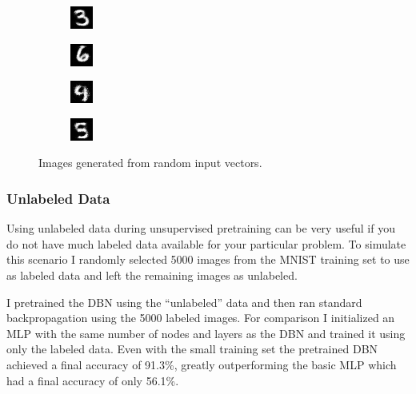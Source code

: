 \documentclass{article}
\begin{document}
	\begin{figure}[h]
		\centering
		\begin{subfigure}[b]{0.2\textwidth}
			\centering
			\includegraphics[scale=2.0]{images/rand_gen1}
		\end{subfigure}
		\begin{subfigure}[b]{0.2\textwidth}
			\centering
			\includegraphics[scale=2.0]{images/rand_gen2}
		\end{subfigure}		
		\begin{subfigure}[b]{0.2\textwidth}
			\centering
			\includegraphics[scale=2.0]{images/rand_gen3}
		\end{subfigure}
		\begin{subfigure}[b]{0.2\textwidth}
			\centering
			\includegraphics[scale=2.0]{images/rand_gen5}
		\end{subfigure}
		
		\caption{Images generated from random input vectors.}
		\label{fig:random_generated}
	\end{figure} 

	\subsubsection{Unlabeled Data}
	Using unlabeled data during unsupervised pretraining can be very useful if you do not have much labeled data available for your particular problem. To simulate this scenario I randomly selected 5000 images from the MNIST training set to use as labeled data and left the remaining images as unlabeled. 
	
	I pretrained the DBN using the ``unlabeled'' data and then ran standard backpropagation using the 5000 labeled images. For comparison I initialized an MLP with the same number of nodes and layers as the DBN and trained it using only the labeled data. Even with the small training set the pretrained DBN achieved a final accuracy of 91.3\%, greatly outperforming the basic MLP which had a final accuracy of only 56.1\%.  
	
\end{document}
